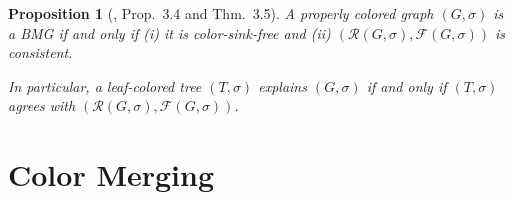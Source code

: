 \documentclass[final,3p,times]{elsarticle}
\newtheorem{proposition}[theorem]{Proposition}%
\newtheorem{definition}{Definition}[section]
\newcommand{\TODO}[1]{\begingroup\color{red}#1\endgroup}
\newcommand{\OLD}[1]{\begingroup\tiny\color{gray}#1\endgroup}
\begin{document}
\begin{proposition}[\cite{Schaller:21b}, Prop.~3.4 and Thm.~3.5]
  \label{prop:BMG-triple-charac}
  A properly colored graph $(G,\sigma)$ is a BMG if and only if (i) it is
  color-sink-free and (ii) $(\mathscr{R}(G,\sigma),\mathscr{F}(G,\sigma))$
  is consistent. 
  
  In particular, a leaf-colored tree $(T , \sigma)$  explains $(G, \sigma )$ 
  if and only if $(T , \sigma)$ agrees with $(\mathscr{R}(G,\sigma),\mathscr{F}(G,\sigma))$. 
\end{proposition}

\section{Color Merging}
\label{sec:operators}


%    
%    
%    	  

%    
%    	  
\end{document}
